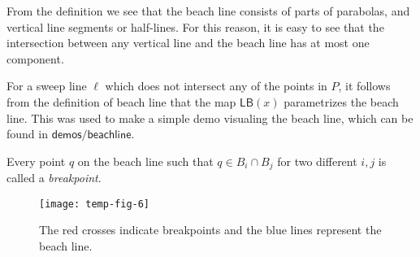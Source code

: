 \begin{rmk}
From the definition we see that the beach line consists of parts of parabolas, and vertical line segments or half-lines. For this reason, it is easy to see that the intersection between any vertical line and the beach line has at most one component.
\end{rmk}
\begin{rmk}
For a sweep line $\ell$ which does not intersect any of the points in $P$, it follows from the definition of beach line that the map $\textsf{LB}(x)$ parametrizes the beach line. This was used to make a simple demo visualing the beach line, which can be found in $\boxed{\textsf{demos/beachline}}$.
\end{rmk}
\begin{defn}[Breakpoint]
Every point $q$ on the beach line such that $q \in B_i \cap B_j$ for two different $i, j$ is called a \textit{breakpoint}.
\end{defn}

\begin{figure}[H]
    \centering
    \texttt{[image: temp-fig-6]}
    \caption{The red crosses indicate breakpoints and the blue lines represent the beach line.}
    \label{fig:example-of-breakpoint}
\end{figure}

